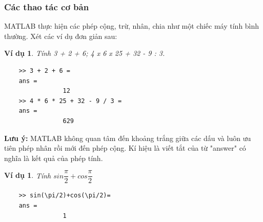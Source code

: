 \documentclass[12pt,a4paper]{article}
\newtheorem{vd}[thm]{Ví dụ}
\begin{document}
\subsubsection{Các thao tác cơ bản}
MATLAB thực hiện các phép cộng, trừ, nhân, chia như một chiếc máy tính bình thường. Xét các ví dụ đơn giản sau:\\
\begin{vd}
	\normalfont Tính 3 + 2 + 6; 4 x 6 x 25 + 32 - 9 : 3.
	\begin{lstlisting}
	>> 3 + 2 + 6 =
	ans =
				12
	>> 4 * 6 * 25 + 32 - 9 / 3 =
	ans =
				629
	\end{lstlisting}
\end{vd}

\textbf{Lưu ý:} MATLAB không quan tâm đến khoảng trắng giữa các dấu và luôn ưu tiên phép nhân rồi mới đến phép cộng. Kí hiệu  là viết tắt của từ "answer" có nghĩa là kết quả của phép tính.\\
\begin{vd}
	\normalfont Tính $sin{\dfrac{\pi}{2}}+cos{\dfrac{\pi}{2}}$\\
	\begin{lstlisting}
	>> sin(\pi/2)+cos(\pi/2)=
	ans =
				1
	\end{lstlisting}
\end{vd}
\end{document}
